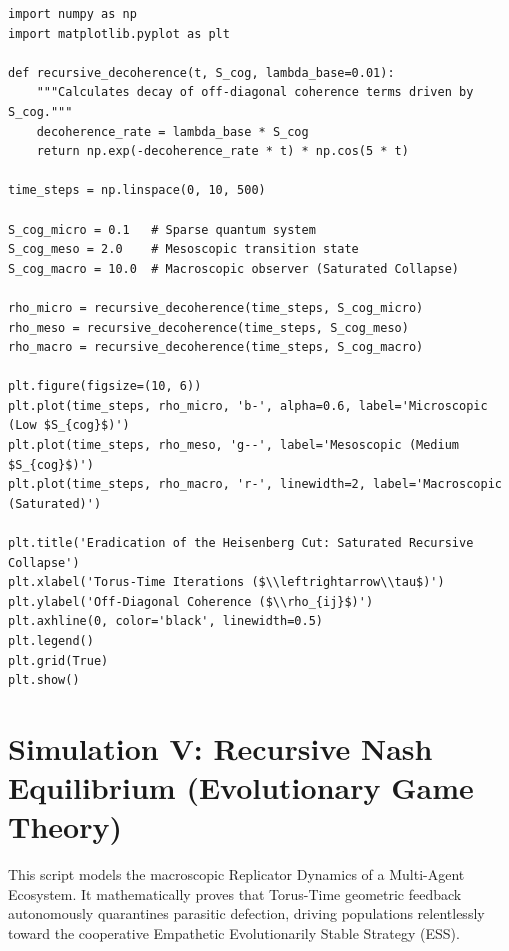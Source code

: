 \documentclass[12pt,openany]{book}
\begin{document}
\begin{verbatim}
import numpy as np
import matplotlib.pyplot as plt

def recursive_decoherence(t, S_cog, lambda_base=0.01):
    """Calculates decay of off-diagonal coherence terms driven by S_cog."""
    decoherence_rate = lambda_base * S_cog
    return np.exp(-decoherence_rate * t) * np.cos(5 * t) 

time_steps = np.linspace(0, 10, 500)

S_cog_micro = 0.1   # Sparse quantum system
S_cog_meso = 2.0    # Mesoscopic transition state
S_cog_macro = 10.0  # Macroscopic observer (Saturated Collapse)

rho_micro = recursive_decoherence(time_steps, S_cog_micro)
rho_meso = recursive_decoherence(time_steps, S_cog_meso)
rho_macro = recursive_decoherence(time_steps, S_cog_macro)

plt.figure(figsize=(10, 6))
plt.plot(time_steps, rho_micro, 'b-', alpha=0.6, label='Microscopic (Low $S_{cog}$)')
plt.plot(time_steps, rho_meso, 'g--', label='Mesoscopic (Medium $S_{cog}$)')
plt.plot(time_steps, rho_macro, 'r-', linewidth=2, label='Macroscopic (Saturated)')

plt.title('Eradication of the Heisenberg Cut: Saturated Recursive Collapse')
plt.xlabel('Torus-Time Iterations ($\\leftrightarrow\\tau$)')
plt.ylabel('Off-Diagonal Coherence ($\\rho_{ij}$)')
plt.axhline(0, color='black', linewidth=0.5)
plt.legend()
plt.grid(True)
plt.show()
\end{verbatim}

\section{Simulation V: Recursive Nash Equilibrium (Evolutionary Game Theory)}
This script models the macroscopic Replicator Dynamics of a Multi-Agent Ecosystem. It mathematically proves that Torus-Time geometric feedback autonomously quarantines parasitic defection, driving populations relentlessly toward the cooperative Empathetic Evolutionarily Stable Strategy (ESS).
\end{document}
